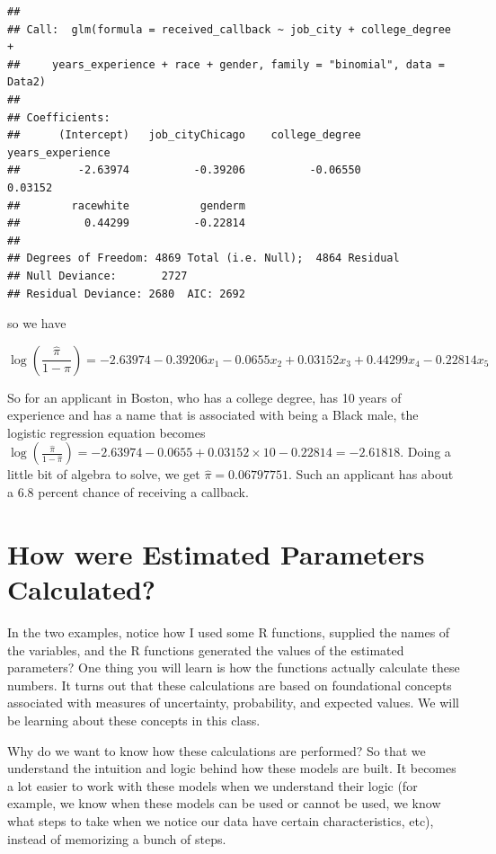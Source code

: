 \documentclass[
]{book}
\begin{document}
\begin{verbatim}
## 
## Call:  glm(formula = received_callback ~ job_city + college_degree + 
##     years_experience + race + gender, family = "binomial", data = Data2)
## 
## Coefficients:
##      (Intercept)   job_cityChicago    college_degree  years_experience  
##         -2.63974          -0.39206          -0.06550           0.03152  
##        racewhite           genderm  
##          0.44299          -0.22814  
## 
## Degrees of Freedom: 4869 Total (i.e. Null);  4864 Residual
## Null Deviance:       2727 
## Residual Deviance: 2680  AIC: 2692
\end{verbatim}

so we have

\[
\log (\frac{\hat{\pi}}{1-\hat{\pi}}) = -2.63974 - 0.39206 x_1 - 0.0655 x_2 + 0.03152 x_3 + 0.44299 x_4 - 0.22814 x_5
\]

So for an applicant in Boston, who has a college degree, has 10 years of experience and has a name that is associated with being a Black male, the logistic regression equation becomes \(\log (\frac{\hat{\pi}}{1-\hat{\pi}}) = -2.63974 - 0.0655 + 0.03152 \times 10 - 0.22814 = -2.61818\). Doing a little bit of algebra to solve, we get \(\hat{\pi} = 0.06797751\). Such an applicant has about a 6.8 percent chance of receiving a callback.

\section{How were Estimated Parameters Calculated?}\label{how-were-estimated-parameters-calculated}

In the two examples, notice how I used some R functions, supplied the names of the variables, and the R functions generated the values of the estimated parameters? One thing you will learn is how the functions actually calculate these numbers. It turns out that these calculations are based on foundational concepts associated with measures of uncertainty, probability, and expected values. We will be learning about these concepts in this class.

Why do we want to know how these calculations are performed? So that we understand the intuition and logic behind how these models are built. It becomes a lot easier to work with these models when we understand their logic (for example, we know when these models can be used or cannot be used, we know what steps to take when we notice our data have certain characteristics, etc), instead of memorizing a bunch of steps.
\end{document}
